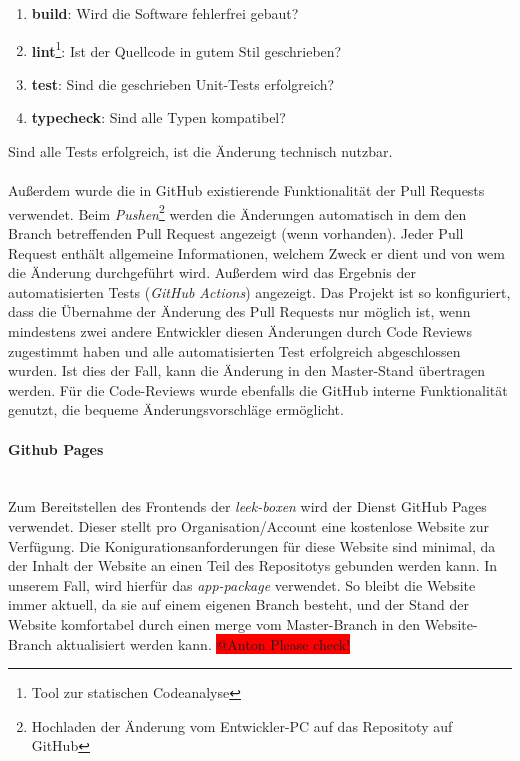 \documentclass[10pt, a4paper]{article}
\begin{document}
\begin{enumerate}
  \item \textbf{build}: Wird die Software fehlerfrei gebaut?
  \item \textbf{lint}\footnote{Tool zur statischen Codeanalyse}: Ist der Quellcode in gutem Stil geschrieben?
  \item \textbf{test}: Sind die geschrieben Unit-Tests erfolgreich?
  \item \textbf{typecheck}: Sind alle Typen kompatibel?
\end{enumerate}
Sind alle Tests erfolgreich, ist die Änderung technisch nutzbar.
\\~\\
Außerdem wurde die in GitHub existierende Funktionalität der Pull Requests verwendet. Beim \textit{Pushen}\footnote{Hochladen der Änderung vom Entwickler-PC auf das Repositoty auf GitHub}
werden die Änderungen automatisch in dem den Branch betreffenden Pull Request angezeigt (wenn vorhanden).
Jeder Pull Request enthält allgemeine Informationen, welchem Zweck er dient und von wem die Änderung durchgeführt wird. Außerdem wird das Ergebnis der automatisierten Tests (\textit{GitHub Actions}) angezeigt.
Das Projekt ist so konfiguriert, dass die Übernahme der Änderung des Pull Requests nur möglich ist, wenn mindestens zwei andere Entwickler diesen Änderungen
durch Code Reviews zugestimmt haben und alle automatisierten Test erfolgreich abgeschlossen wurden. Ist dies der Fall, kann die Änderung in den Master-Stand übertragen werden.
Für die Code-Reviews wurde ebenfalls die GitHub interne Funktionalität genutzt, die bequeme Änderungsvorschläge ermöglicht.

\paragraph{Github Pages} $~$ \\
Zum Bereitstellen des Frontends der \textit{leek-boxen} wird der Dienst GitHub Pages verwendet. Dieser stellt pro Organisation/Account eine kostenlose Website zur Verfügung.
Die Konigurationsanforderungen für diese Website sind minimal, da der Inhalt der Website an einen Teil des Repositotys gebunden werden kann. In unserem Fall, wird hierfür das \textit{app-package} verwendet.
So bleibt die Website immer aktuell, da sie auf einem eigenen Branch besteht, und der Stand der Website komfortabel durch einen merge vom Master-Branch in den Website-Branch aktualisiert werden kann.
\colorbox{red}{@Anton Please check!}
\end{document}
